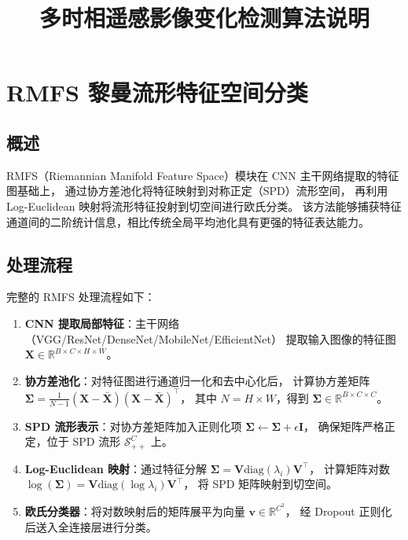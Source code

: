 \documentclass[12pt,a4paper]{article}
\title{多时相遥感影像变化检测算法说明}
\author{}
\date{}
\begin{document}
\maketitle

\section{RMFS 黎曼流形特征空间分类}

\subsection{概述}

RMFS（Riemannian Manifold Feature Space）模块在 CNN 主干网络提取的特征图基础上，
通过协方差池化将特征映射到对称正定（SPD）流形空间，
再利用 Log-Euclidean 映射将流形特征投射到切空间进行欧氏分类。
该方法能够捕获特征通道间的二阶统计信息，相比传统全局平均池化具有更强的特征表达能力。

\subsection{处理流程}

完整的 RMFS 处理流程如下：

\begin{enumerate}
    \item \textbf{CNN 提取局部特征}：主干网络（VGG/ResNet/DenseNet/MobileNet/EfficientNet）
          提取输入图像的特征图 $\mathbf{X} \in \mathbb{R}^{B \times C \times H \times W}$。
    \item \textbf{协方差池化}：对特征图进行通道归一化和去中心化后，
          计算协方差矩阵 $\mathbf{\Sigma} = \frac{1}{N-1}(\mathbf{X} - \bar{\mathbf{X}})(\mathbf{X} - \bar{\mathbf{X}})^\top$，
          其中 $N = H \times W$，得到 $\mathbf{\Sigma} \in \mathbb{R}^{B \times C \times C}$。
    \item \textbf{SPD 流形表示}：对协方差矩阵加入正则化项 $\mathbf{\Sigma} \leftarrow \mathbf{\Sigma} + \epsilon \mathbf{I}$，
          确保矩阵严格正定，位于 SPD 流形 $\mathcal{S}_{++}^C$ 上。
    \item \textbf{Log-Euclidean 映射}：通过特征分解 $\mathbf{\Sigma} = \mathbf{V} \text{diag}(\lambda_i) \mathbf{V}^\top$，
          计算矩阵对数 $\log(\mathbf{\Sigma}) = \mathbf{V} \text{diag}(\log \lambda_i) \mathbf{V}^\top$，
          将 SPD 矩阵映射到切空间。
    \item \textbf{欧氏分类器}：将对数映射后的矩阵展平为向量 $\mathbf{v} \in \mathbb{R}^{C^2}$，
          经 Dropout 正则化后送入全连接层进行分类。
\end{enumerate}
\end{document}
